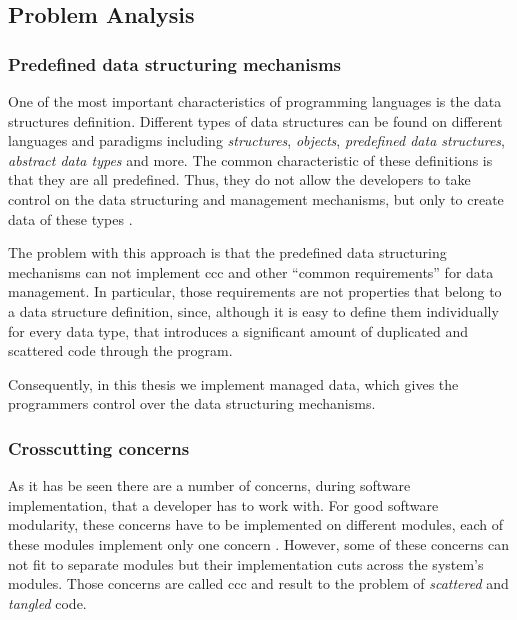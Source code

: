 \subsection{Problem Analysis}\label{Problem Analysis}

\subsubsection{Predefined data structuring mechanisms}\label{Predefined data structuring mechanisms problem}
One of the most important characteristics of programming languages is the data structures definition.
Different types of data structures can be found on different languages and paradigms including \textit{structures}, \textit{objects}, \textit{predefined data structures}, \textit{abstract data types} and more.
The common characteristic of these definitions is that they are all predefined. 
Thus, they do not allow the developers to take control on the data structuring and management mechanisms, but only to create data of these types \cite{loh2012managed}.

The problem with this approach is that the predefined data structuring mechanisms can not implement \acrlong{ccc} and other ``common requirements'' for data management. 
In particular, those requirements are not properties that belong to a data structure definition, since, although it is easy to define them individually for every data type, that introduces a significant amount of duplicated and scattered code through the program.

Consequently, in this thesis we implement managed data, which gives the programmers control over the data structuring mechanisms.

\subsubsection{Crosscutting concerns}\label{Cross cutting concerns problem}

As it has be seen \cite{hannemann2005role} there are a number of concerns, during software implementation, that a developer has to work with. 
For good software modularity, these concerns have to be implemented on different modules, each of these modules implement only one concern \cite{parnas1972criteria}.
However, some of these concerns can not fit to separate modules but their implementation cuts across the system's modules. 
Those concerns are called \acrlong{ccc} and result to the problem of \textit{scattered} and \textit{tangled} code. 

